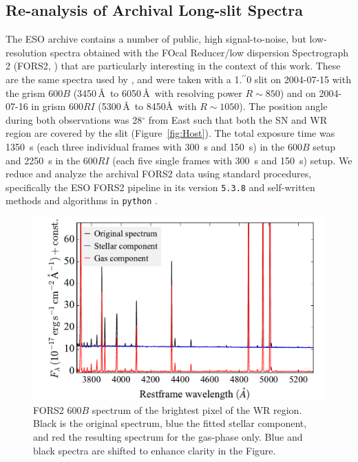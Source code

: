 \documentclass[traditabstract]{aa}
\newcommand{\farc}{\hbox{$.\!\!^{\prime\prime}$}}
\begin{document}
\begin{appendix}

\section{Re-analysis of Archival Long-slit Spectra}
\label{app:fors}

The ESO archive contains a number of public, high signal-to-noise, but low-resolution spectra obtained with the FOcal Reducer/low dispersion Spectrograph 2 (FORS2, \citealt{1998Msngr..94....1A}) that are particularly interesting in the context of this work. These are the same spectra used by \citet{2006A&A...454..103H}, and were taken with a 1\farc{0} slit on 2004-07-15 with the grism 600$B$ (3450\,\AA\, to 6050\,\AA\, with resolving power $R\sim850$) and on 2004-07-16 in grism 600$RI$ (5300\,\AA\, to 8450\AA\, with $R\sim1050$). The position angle during both observations was 28$^\circ$ from East such that both the SN and WR region are covered by the slit (Figure~\ref{fig:Host}). The total exposure time was 1350~s (each three individual frames with 300~s and 150~s) in the 600$B$ setup and 2250~s in the 600$RI$ (each five single frames with 300~s and 150~s) setup. We reduce and analyze the archival FORS2 data using standard procedures, specifically the ESO FORS2 pipeline in its version \texttt{5.3.8} and self-written methods and algorithms in \texttt{python} \citep{2015A&A...581A.125K}.

\begin{figure}
\includegraphics[angle=0, width=0.93\columnwidth]{Figs/FORS2_3700_5301_starlight.pdf}
\caption{FORS2 600$B$ spectrum of the brightest pixel of the WR region. Black is the original spectrum, blue the fitted stellar component, and red the resulting spectrum for the gas-phase only. Blue and black spectra are shifted to enhance clarity in the Figure.}
\label{fig:FORSWR}
\end{figure}


\end{appendix}
\end{document}
